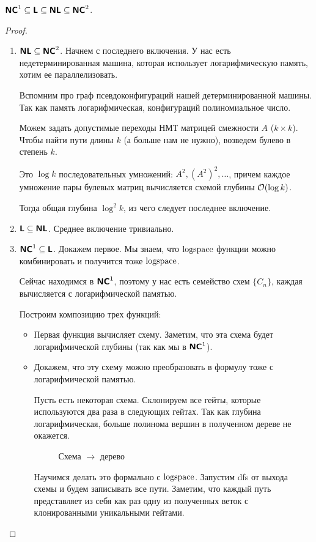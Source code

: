 \begin{thm}
	$ \textmd{\textbf{\textsf{NC}}}^{1} \subseteq \textmd{\textbf{\textsf{L}}} \subseteq \textmd{\textbf{\textsf{NL}}} \subseteq \textmd{\textbf{\textsf{NC}}}^{2}$.
\end{thm}
\begin{proof}
	\begin{enumerate}
		\item $\textmd{\textbf{\textsf{NL}}} \subseteq \textmd{\textbf{\textsf{NC}}}^2$. Начнем с последнего включения. У нас есть недетерминированная машина, которая использует логарифмическую память, хотим ее параллелизовать.

			Вспомним про граф псевдоконфигураций нашей детерминированной машины. Так как память логарифмическая, конфигураций полиномиальное число.

			Можем задать допустимые переходы НМТ матрицей смежности $ A$ ($ k \times k$). Чтобы найти пути длины $ k$ (а больше нам не нужно), возведем булево в степень  $ k$.

			Это $ \log k$ последовательных умножений: $ A^2, (A^2)^2, \ldots  $, причем каждое умножение пары булевых матриц вычисляется схемой глубины $ \mathcal{O}(\log k)$.

			Тогда общая глубина $ \log^2 k$, из чего следует последнее включение.
		\item $\textmd{\textbf{\textsf{L}}} \subseteq \textmd{\textbf{\textsf{NL}}}$. Среднее включение тривиально.
		\item $\textmd{\textbf{\textsf{NC}}}^1 \subseteq \textmd{\textbf{\textsf{L}}}$. Докажем первое.
			Мы знаем, что $ \textmd{logspace}$ функции можно комбинировать и получится тоже $ \textmd{logspace}$.

			Сейчас находимся в $ \textmd{\textbf{\textsf{NC}}}^{1}$, поэтому у нас есть семейство схем $ \{C_n\}$, каждая вычисляется с логарифмической памятью.

			Построим композицию трех функций:
			\begin{itemize}
				\item  Первая функция вычисляет схему. Заметим, что эта схема будет логарифмической глубины  (так как мы в $ \textmd{\textbf{\textsf{NC}}}^{1}$).
				\item Докажем, что эту схему  можно преобразовать в формулу тоже с логарифмической памятью.

					Пусть есть некоторая схема. Склонируем все гейты, которые используются два раза в следующих гейтах. Так как глубина логарифмическая, больше полинома вершин в полученном дереве не окажется.
					\begin{figure}[ht]
						\centering
						\caption{Схема $\to$ дерево}
						\label{fig:dag-tree}
					\end{figure}
					Научимся делать это формально с $ \textmd{logspace}$. Запустим dfs от выхода схемы и будем записывать все пути. Заметим, что каждый путь представляет из себя как раз одну из полученных веток с клонированными уникальными гейтами.


\end{itemize}
\end{enumerate}
\end{proof}
